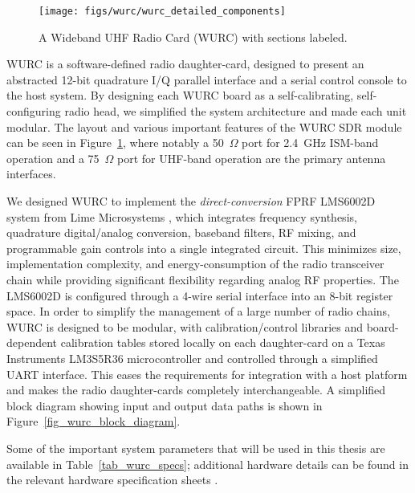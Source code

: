 \begin{figure}[ht]
\centering
  \texttt{[image: figs/wurc/wurc\_detailed\_components]}   
    \caption{A Wideband UHF Radio Card (WURC) with sections labeled.}
\label{fig_wurc_hw_diagram}
\end{figure}

	\ac{WURC} is a software-defined radio daughter-card, designed to present an abstracted 12-bit quadrature I/Q parallel interface and a serial control console to the host system.
	By designing each \ac{WURC} board as a self-calibrating, self-configuring radio head, we simplified the system architecture and made each unit modular.
	The layout and various important features of the \ac{WURC} \ac{SDR} module can be seen in Figure~\ref{fig_wurc_hw_diagram}, where notably a 50~$\Omega$ port for 2.4~GHz \ac{ISM}-band operation and a 75~$\Omega$ port for UHF-band operation are the primary antenna interfaces.
	
	We designed \ac{WURC} to implement the \textit{direct-conversion} \acf{FPRF} LMS6002D system from Lime Microsystems \cite{lime2012lms6002d}, which integrates frequency synthesis, quadrature digital/analog conversion, baseband filters, RF mixing, and programmable gain controls into a single integrated circuit.
		This minimizes size, implementation complexity, and energy-consumption of the radio transceiver chain while providing significant flexibility regarding analog RF properties.
	The LMS6002D is configured through a 4-wire serial interface into an 8-bit register space.
	In order to simplify the management of a large number of radio chains,  \ac{WURC} is designed to be modular, with calibration/control libraries and board-dependent calibration tables stored locally on each daughter-card on a Texas Instruments LM3S5R36 microcontroller \cite{ti2012stellaris} and controlled through a simplified \ac{UART} interface.
	This eases the requirements for integration with a host platform and makes the radio daughter-cards completely interchangeable.
	A simplified block diagram showing input and output data paths is shown in Figure~\ref{fig_wurc_block_diagram}.
	
	Some of the important system parameters that will be used in this thesis are available in Table~\ref{tab_wurc_specs}; additional hardware details can be found in the relevant hardware specification sheets \cite{lime2012lms6002d, ti2012stellaris}.



